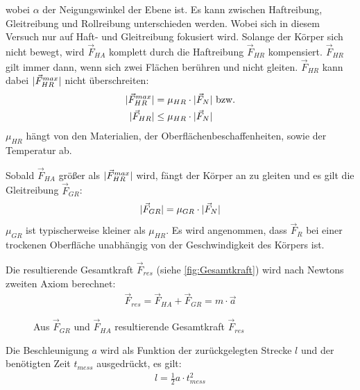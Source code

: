 wobei $\alpha$ der Neigungswinkel der Ebene ist.
Es kann zwischen Haftreibung, Gleitreibung und Rollreibung unterschieden werden. Wobei sich in diesem Versuch nur auf Haft- und Gleitreibung fokusiert wird.
\newline
Solange der Körper sich nicht bewegt, wird $\vec{F}_{HA}$ komplett durch die Haftreibung $\vec{F}_{HR}$ kompensiert. $\vec{F}_{HR}$ gilt immer dann, wenn sich zwei Flächen berühren und nicht gleiten. $\vec{F}_{HR}$ kann dabei $\lvert\vec{F}_{HR}^{max}\rvert$ nicht überschreiten:
\begin{subequations}
    \begin{align}
        \lvert\vec{F}_{HR}^{max}\rvert &= \mu_{HR} \cdot \lvert\vec{F}_{N}\rvert \text{ bzw.}\\
        \lvert\vec{F}_{HR}\rvert &\leq \mu_{HR} \cdot \lvert\vec{F}_{N}\rvert
    \end{align}
    \label{eq:F_HR}
\end{subequations}
$\mu_{HR}$ hängt von den Materialien, der Oberflächenbeschaffenheiten, sowie der Temperatur ab. \newline

Sobald $\vec{F}_{HA}$ größer als $\lvert\vec{F}_{HR}^{max}\rvert$ wird, fängt der Körper an zu gleiten und es gilt die Gleitreibung $\vec{F}_{GR}$:
\begin{align}
    \lvert\vec{F}_{GR}\rvert = \mu_{GR} \cdot \lvert\vec{F}_{N}\rvert
    \label{eq:F_GR}
\end{align}
$\mu_{GR}$ ist typischerweise kleiner als $\mu_{HR}$. Es wird angenommen, dass $\vec{F}_{R}$ bei einer trockenen Oberfläche unabhängig von der Geschwindigkeit des Körpers ist.\smallskip

Die resultierende Gesamtkraft $\vec{F}_{res}$ (siehe \autoref{fig:Gesamtkraft}) wird nach Newtons zweiten Axiom berechnet:
\begin{align}
    \vec{F}_{res} = \vec{F}_{HA} + \vec{F}_{GR} = m \cdot \vec{a}
\end{align}

\begin{figure}[ht]
    \centering
    
    \caption[Resultierende Gesamtkraft]{Aus $\vec{F}_{GR}$ und $\vec{F}_{HA}$ resultierende Gesamtkraft $\vec{F}_{res}$ \cite{schiefeEbene:Fromme}}
    \label{fig:Gesamtkraft}
\end{figure}

Die Beschleunigung $a$ wird als Funktion der zurückgelegten Strecke $l$ und der benötigten Zeit $t_{mess}$ ausgedrückt, es gilt:
\begin{align}
    l = \frac{1}{2} a \cdot t_{mess}^2
\end{align}